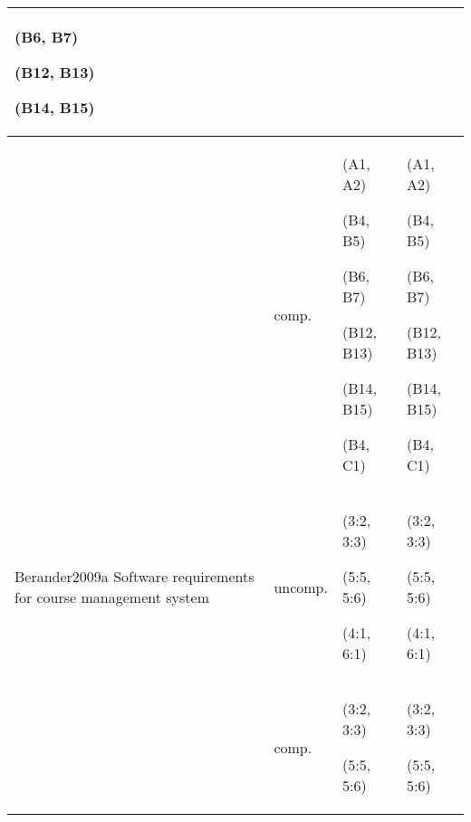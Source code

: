 \begin{table*}
\begin{tabular}{
|>{\centering}p{}
|>{\centering}p{}
|>{\centering}p{}
|>{\centering}p{}|}
(B6, B7)

(B12, B13)

(B14, B15)\tabularnewline
\hline 
 & comp. & (A1, A2)

(B4, B5)

(B6, B7)

(B12, B13)

(B14, B15)

(B4, C1) & (A1, A2)

(B4, B5)

(B6, B7)

(B12, B13)

(B14, B15)

(B4, C1)\tabularnewline
\hline 
Berander2009a Software requirements for course management system & uncomp. & (3:2, 3:3)

(5:5, 5:6)

(4:1, 6:1) & (3:2, 3:3)

(5:5, 5:6)

(4:1, 6:1)\tabularnewline
\hline 
 & comp. & (3:2, 3:3)

(5:5, 5:6) & (3:2, 3:3)

(5:5, 5:6)\tabularnewline
\hline
\end{tabular}%
\end{table*}



